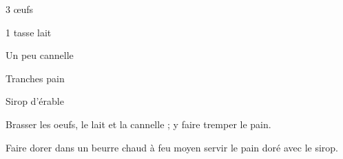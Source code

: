 


\totaltime{}


\begin{ingredients}
    \item 3 œufs
    \item 1 tasse lait
    \item Un peu cannelle
    \item Tranches pain
    \item Sirop d'érable
\end{ingredients}

\begin{steps}
    \item Brasser les oeufs, le lait et la cannelle ; y faire tremper le pain.
    \item Faire dorer dans un beurre chaud à feu moyen servir le pain doré avec le sirop.
\end{steps}
